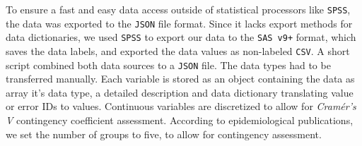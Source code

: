 \documentclass[journal]{style/vgtc} 			          %
\begin{document}
To ensure a fast and easy data access outside of statistical processors like \texttt{SPSS}, the data was exported to the \texttt{JSON} file format.
%
Since it lacks export methods for data dictionaries, we used \texttt{SPSS} to export our data to the \texttt{SAS v9+} format, which saves the data labels, and exported the data values as non-labeled \texttt{CSV}.
%
A short script combined both data sources to a \texttt{JSON} file.
%
The data types had to be transferred manually.
%
Each variable is stored as an object containing the data as array it's data type, a detailed description and data dictionary translating value or error IDs to values.
%
Continuous variables are discretized to allow for \emph{Cram\'{e}r's V} contingency coefficient assessment.
%
According to epidemiological publications, we set the number of groups to five, to allow for contingency assessment.
\end{document}
